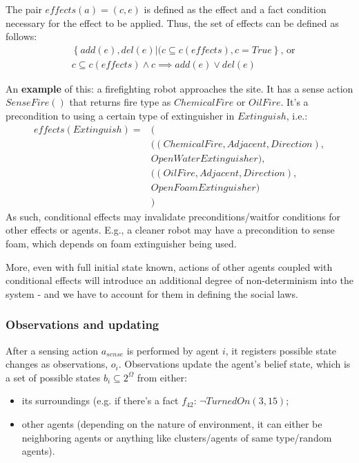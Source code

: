 \documentclass[fleqn,10pt]{olplainarticle}
\begin{document}
The pair $effects(a) = (c, e)$ is defined as the effect and a fact condition necessary for the effect to be applied. Thus, the set of effects can be defined as follows: 
\begin{equation}
    \begin{aligned}
    &\left\{add(e), del(e) \vert (c \subseteq c(effects), c = True \right\} \text{, or} \\
    &c \subseteq c(effects) \land c \implies add(e) \lor del(e)
    \end{aligned}
\end{equation}

An \textbf{example} of this: a firefighting robot approaches the site. It has a sense action $SenseFire()$ that returns fire type as $ChemicalFire$ or $OilFire$. It's a precondition to using a certain type of extinguisher in $Extinguish$, i.e.:
\begin{equation*}
    \begin{aligned}
        effects(Extinguish)=&( \\
        &((ChemicalFire, Adjacent, Direction), \\
        &OpenWaterExtinguisher),\\
        &((OilFire, Adjacent, Direction), \\
        &OpenFoamExtinguisher) \\&)
    \end{aligned}
\end{equation*}
As such, conditional effects may invalidate preconditions/waitfor conditions for other effects or agents. E.g., a cleaner robot may have a precondition to sense foam, which depends on foam extinguisher being used.

More, even with full initial state known, actions of other agents coupled with conditional effects will introduce an additional degree of non-determinism into the system - and we have to account for them in defining the social laws.

\subsubsection{Observations and updating}
After a sensing action $a_{sense}$ is performed by agent $i$, it registers possible state changes as observations, $o_i$. Observations update the agent's belief state, which is a set of possible states $b_i \subseteq 2^\Omega$ from either:
\begin{itemize}
    \item its surroundings (e.g. if there's a fact $f_{42}$: $\neg TurnedOn(3, 15)$;
    \item       other agents (depending on the nature of environment, it can either be neighboring agents or anything like clusters/agents of same type/random agents).
\end{itemize}
\end{document}
